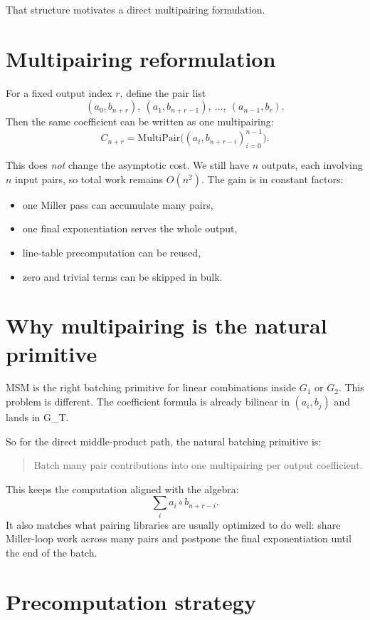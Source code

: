 \documentclass[11pt]{article}
\newcommand{\GT}{G_T}
\begin{document}
That structure motivates a direct multipairing formulation.

\section{Multipairing reformulation}

For a fixed output index $r$, define the pair list
\[
(a_0, b_{n+r}),
\ (a_1, b_{n+r-1}),
\ \dots,
\ (a_{n-1}, b_r).
\]
Then the same coefficient can be written as one multipairing:
\[
C_{n+r}
=
\mathrm{MultiPair}\big((a_i, b_{n+r-i})_{i=0}^{n-1}\big).
\]

This does \emph{not} change the asymptotic cost.
We still have $n$ outputs, each involving $n$ input pairs, so total work
remains $O(n^2)$.
The gain is in constant factors:
\begin{itemize}[itemsep=0.3em, topsep=0.4em]
  \item one Miller pass can accumulate many pairs,
  \item one final exponentiation serves the whole output,
  \item line-table precomputation can be reused,
  \item zero and trivial terms can be skipped in bulk.
\end{itemize}

\section{Why multipairing is the natural primitive}

MSM is the right batching primitive for linear combinations inside $G_1$ or
$G_2$.
This problem is different.
The coefficient formula is already bilinear in $(a_i, b_j)$ and lands in
\GT.

So for the direct middle-product path, the natural batching primitive is:
\begin{quote}
Batch many pair contributions into one multipairing per output coefficient.
\end{quote}

This keeps the computation aligned with the algebra:
\[
\sum_i a_i \circ b_{n+r-i}.
\]
It also matches what pairing libraries are usually optimized to do well:
share Miller-loop work across many pairs and postpone the final exponentiation
until the end of the batch.

\section{Precomputation strategy}
\end{document}

